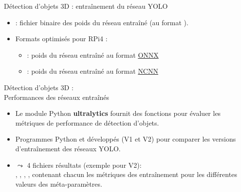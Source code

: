 \documentclass[11pt,serif,mathserif,compress,hyperref={colorlinks}]{beamer}
\begin{document}
\begin{frame}{Détection d'objets 3D : entraînement du réseau YOLO}
  
  \begin{tcolorbox}[title={Contenu des dossiers\\ \textbf{UCIA-YOLOvvv/batch-BB\_epo-EEE/weights}}, add to width=.7cm]
    \begin{itemize}
    \item {} : fichier binaire des poids du réseau entraîné (au format ).
    \item Formats optimisés pour RPi4 :
      \begin{itemize}
      \item {} : poids du réseau entraîné au format \href{https://docs.ultralytics.com/fr/integrations/onnx/}{ONNX}
      \item {} : poids du réseau entraîné au format \href{https://docs.ultralytics.com/fr/integrations/ncnn/}{NCNN}
      \end{itemize}
    \end{itemize}
    
  \end{tcolorbox}
    
\end{frame}

\begin{frame}{Détection d'objets 3D : \\Performances des réseaux entraînés}

  \begin{itemize}
  \item Le module Python \textbf{ultralytics} fournit des fonctions pour évaluer les
    métriques de performance de détection d'objets.\smallskip
    
  \item Programmes Python  et  développés 
    (V1 et V2) pour comparer les versions d’entraînement des réseaux YOLO.\smallskip
  \item $\leadsto$ 4 fichiers résultats (exemple pour V2): \\
    ,  ,
    ,  , 
    contenant chacun les métriques des entraînement pour les différentes valeurs des méta-paramètres.
  \end{itemize}
    
\end{frame}
\end{document}
